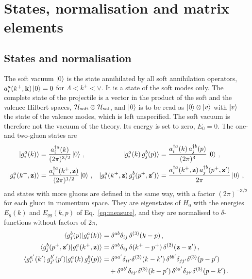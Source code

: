 \section{States, normalisation and matrix elements}\label{app:states}

\subsection{States and normalisation}

The soft vacuum $\ket0$ is the state annihilated by all soft annihilation operators, $a^a_i(k^+,\mathbf{k})\ket0=0$ for $\Lambda<k^+<\vee$. It is a state of the soft modes only. The complete state of the projectile is a vector in the product of the soft and the valence Hilbert spaces, $\mathcal H_{\rm soft}\otimes\mathcal H_{\rm val}$, and $\ket0$ is to be read as $\ket0\otimes\ket v$ with $\ket v$ the state of the valence modes, which is left unspecified. The soft vacuum is therefore not the vacuum of the theory. Its energy is set to zero, $E_0=0$. The one- and two-gluon states are
\begin{align}\label{eq:states}
\ket{g^a_i(k)}&=\frac{a^{\dagger a}_i(k)}{(2\pi)^{3/2}}\ket0\,,&
\ket{g^a_i(k)\,g^b_j(p)}&=\frac{a^{\dagger a}_i(k)\,a^{\dagger b}_j(p)}{(2\pi)^3}\ket0\,,\notag\\
\ket{g^a_i(k^+,\mathbf{z})}&=\frac{a^{\dagger a}_i(k^+,\mathbf{z})}{(2\pi)^{1/2}}\ket0\,,&
\ket{g^a_i(k^+,\mathbf{z})\,g^b_j(p^+,\mathbf{z}')}&=\frac{a^{\dagger a}_i(k^+,\mathbf{z})\,a^{\dagger b}_j(p^+,\mathbf{z}')}{2\pi}\ket0\,,
\end{align}
and states with more gluons are defined in the same way, with a factor $(2\pi)^{-3/2}$ for each gluon in momentum space. They are eigenstates of $H_0$ with the energies $E_g(k)$ and $E_{gg}(k,p)$ of Eq.~\eqref{eq:measure}, and they are normalised to $\delta$-functions without factors of $2\pi$,
\begin{align}\label{eq:norms}
\braket{g^b_j(p)|g^a_i(k)}&=\delta^{ab}\delta_{ij}\,\delta^{(3)}(k-p)\,,\notag\\
\braket{g^b_j(p^+,\mathbf{z}')|g^a_i(k^+,\mathbf{z})}&=\delta^{ab}\delta_{ij}\,\delta(k^+-p^+)\,\delta^{(2)}(\mathbf{z}-\mathbf{z}')\,,\notag\\
\braket{g^{a'}_{i'}(k')\,g^{b'}_{j'}(p')|g^a_i(k)\,g^b_j(p)}&=\delta^{aa'}\delta_{ii'}\delta^{(3)}(k-k')\,\delta^{bb'}\delta_{jj'}\delta^{(3)}(p-p')\notag\\
&\quad+\delta^{ab'}\delta_{ij'}\delta^{(3)}(k-p')\,\delta^{ba'}\delta_{ji'}\delta^{(3)}(p-k')\,.
\end{align}
